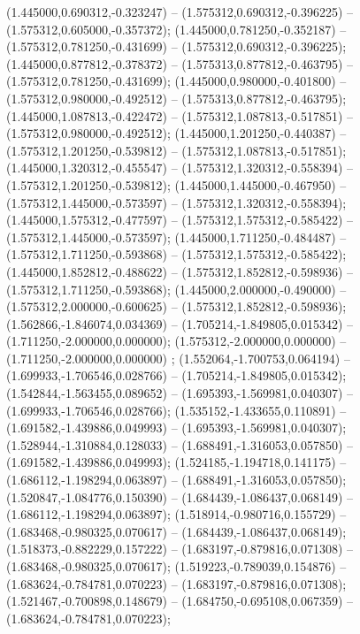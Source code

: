  (1.445000,0.690312,-0.323247) -- (1.575312,0.690312,-0.396225) -- (1.575312,0.605000,-0.357372);
 (1.445000,0.781250,-0.352187) -- (1.575312,0.781250,-0.431699) -- (1.575312,0.690312,-0.396225);
 (1.445000,0.877812,-0.378372) -- (1.575313,0.877812,-0.463795) -- (1.575312,0.781250,-0.431699);
 (1.445000,0.980000,-0.401800) -- (1.575312,0.980000,-0.492512) -- (1.575313,0.877812,-0.463795);
 (1.445000,1.087813,-0.422472) -- (1.575312,1.087813,-0.517851) -- (1.575312,0.980000,-0.492512);
 (1.445000,1.201250,-0.440387) -- (1.575312,1.201250,-0.539812) -- (1.575312,1.087813,-0.517851);
 (1.445000,1.320312,-0.455547) -- (1.575312,1.320312,-0.558394) -- (1.575312,1.201250,-0.539812);
 (1.445000,1.445000,-0.467950) -- (1.575312,1.445000,-0.573597) -- (1.575312,1.320312,-0.558394);
 (1.445000,1.575312,-0.477597) -- (1.575312,1.575312,-0.585422) -- (1.575312,1.445000,-0.573597);
 (1.445000,1.711250,-0.484487) -- (1.575312,1.711250,-0.593868) -- (1.575312,1.575312,-0.585422);
 (1.445000,1.852812,-0.488622) -- (1.575312,1.852812,-0.598936) -- (1.575312,1.711250,-0.593868);
 (1.445000,2.000000,-0.490000) -- (1.575312,2.000000,-0.600625) -- (1.575312,1.852812,-0.598936);
 (1.562866,-1.846074,0.034369) -- (1.705214,-1.849805,0.015342) -- (1.711250,-2.000000,0.000000);
 (1.575312,-2.000000,0.000000) -- (1.711250,-2.000000,0.000000) ;
 (1.552064,-1.700753,0.064194) -- (1.699933,-1.706546,0.028766) -- (1.705214,-1.849805,0.015342);
 (1.542844,-1.563455,0.089652) -- (1.695393,-1.569981,0.040307) -- (1.699933,-1.706546,0.028766);
 (1.535152,-1.433655,0.110891) -- (1.691582,-1.439886,0.049993) -- (1.695393,-1.569981,0.040307);
 (1.528944,-1.310884,0.128033) -- (1.688491,-1.316053,0.057850) -- (1.691582,-1.439886,0.049993);
 (1.524185,-1.194718,0.141175) -- (1.686112,-1.198294,0.063897) -- (1.688491,-1.316053,0.057850);
 (1.520847,-1.084776,0.150390) -- (1.684439,-1.086437,0.068149) -- (1.686112,-1.198294,0.063897);
 (1.518914,-0.980716,0.155729) -- (1.683468,-0.980325,0.070617) -- (1.684439,-1.086437,0.068149);
 (1.518373,-0.882229,0.157222) -- (1.683197,-0.879816,0.071308) -- (1.683468,-0.980325,0.070617);
 (1.519223,-0.789039,0.154876) -- (1.683624,-0.784781,0.070223) -- (1.683197,-0.879816,0.071308);
 (1.521467,-0.700898,0.148679) -- (1.684750,-0.695108,0.067359) -- (1.683624,-0.784781,0.070223);
